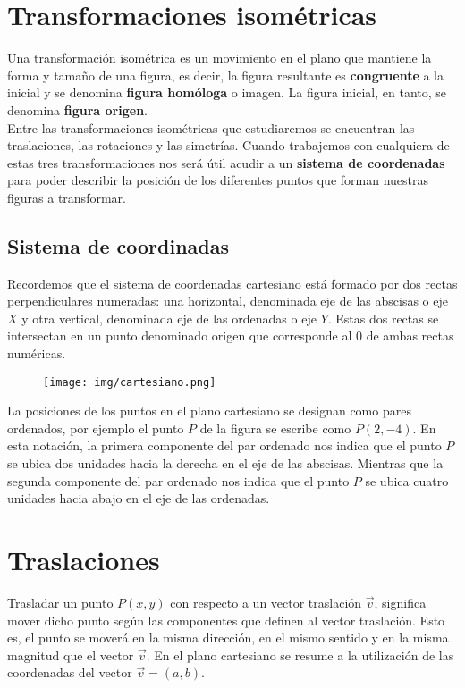 \section{Transformaciones isométricas}
Una transformación isométrica es un movimiento en el plano que mantiene la forma y tamaño de una figura, es decir, la figura resultante es \textbf{congruente} a la inicial y se denomina \textbf{figura homóloga} o imagen. La figura inicial, en tanto, se denomina \textbf{figura origen}.\\

Entre las transformaciones isométricas que estudiaremos se encuentran las traslaciones, las rotaciones y las simetrías. Cuando trabajemos con cualquiera de estas tres transformaciones nos será útil acudir a un \textbf{sistema de coordenadas} para poder describir la posición de los diferentes puntos que forman nuestras figuras a transformar.\\

\subsection{Sistema de coordinadas}
Recordemos que el sistema de coordenadas cartesiano está formado por dos rectas perpendiculares numeradas: una horizontal, denominada eje de las abscisas o eje $X$ y otra vertical, denominada eje de las ordenadas o eje $Y$. Estas dos rectas se intersectan en un punto denominado origen que corresponde al $0$ de ambas rectas numéricas.

\begin{figure}[hbt!]
	\centering
	\texttt{[image: img/cartesiano.png]}
\end{figure}

La posiciones de los puntos en el plano cartesiano se designan como pares ordenados, por ejemplo el punto $P$ de la figura se escribe como $P(2,-4)$. En esta notación, la primera componente del par ordenado nos indica que el punto $P$ se ubica dos unidades hacia la derecha en el eje de las abscisas. Mientras que la segunda componente del par ordenado nos indica que el punto $P$ se ubica cuatro unidades hacia abajo en el eje de las ordenadas.

\section{Traslaciones}
Trasladar un punto $P(x,y)$ con respecto a un vector traslación $\vec v$, significa mover dicho punto según las componentes que definen al vector traslación. Esto es, el punto se moverá en la misma dirección, en el mismo sentido y en la misma magnitud que el vector $\vec{v}$. En el plano cartesiano se resume a la utilización de las coordenadas del vector $\vec{v} = (a, b)$.\\

